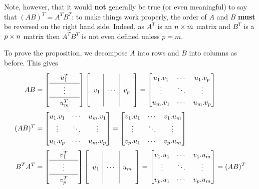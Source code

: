 \documentclass[reqno]{amsart}
\theoremstyle{definition}
\begin{document}
Note, however, that it would \textbf{not} generally be true (or even
meaningful) to say that $(AB)^T=A^TB^T$: to make things work properly,
the order of $A$ and $B$ \textbf{must} be reversed on the right hand
side.  Indeed, as $A^T$ is an $n\times m$ matrix and $B^T$ is a $p\times n$
matrix then $A^TB^T$ is not even defined unless $p=m$.

To prove the proposition, we decompose $A$ into rows and $B$ into
columns as before.  This gives
\begin{align*}
  AB &= {\renewcommand{\arraystretch}{1.3}
         \left[\begin{array}{ccc}
         & u_1^T & \\ \hline
         & \vdots & \\ \hline
         & u_m^T &
        \end{array}\right]}
        \left[\begin{array}{c|c|c}
         && \\ v_1 & \dotsb & v_p \\ &&
        \end{array}\right]
      = \bbm
          u_1.v_1 & \cdots & u_1.v_p \\
          \vdots  & \ddots & \vdots \\
          u_m.v_1 & \cdots & u_m.v_p
        \ebm \\
  (AB)^T &=
        \bbm
          u_1.v_1 & \cdots & u_m.v_1 \\
          \vdots  & \ddots & \vdots \\
          u_1.v_p & \cdots & u_m.v_p
        \ebm =
        \bbm
          v_1.u_1 & \cdots & v_1.u_m \\
          \vdots  & \ddots & \vdots \\
          v_p.u_1 & \cdots & v_p.u_m
        \ebm \\
  B^TA^T &=
        {\renewcommand{\arraystretch}{1.3}
         \left[\begin{array}{ccc}
         & v_1^T & \\ \hline
         & \vdots & \\ \hline
         & v_p^T &
        \end{array}\right]}
        \left[\begin{array}{c|c|c}
         && \\ u_1 & \dotsb & u_m \\ &&
        \end{array}\right] =
        \bbm
          v_1.u_1 & \cdots & v_1.u_m \\
          \vdots  & \ddots & \vdots \\
          v_p.u_1 & \cdots & v_p.u_m
        \ebm = (AB)^T
\end{align*}
\end{document}
